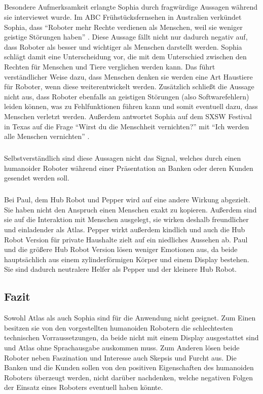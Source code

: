 \subparagraph{}
Besondere Aufmerksamkeit erlangte Sophia durch fragwürdige Aussagen während sie
interviewet wurde. Im ABC Frühstücksfernsehen in Australien verkündet Sophia,
dass "`Roboter mehr Rechte verdienen als Menschen, weil sie weniger geistige
Störungen haben"' \cite{Harald2017}. Diese Aussage fällt nicht nur dadurch
negativ auf, dass Roboter als besser und wichtiger als Menschen darstellt
werden. Sophia schlägt damit eine Unterscheidung vor, die mit dem Unterschied
zwischen den Rechten für Menschen und Tiere verglichen werden kann. Das führt
verständlicher Weise dazu, dass Menschen denken sie werden eine Art Haustiere
für Roboter, wenn diese weiterentwickelt werden. Zusätzlich schließt die
Aussage nicht aus, dass Roboter ebenfalls an geistigen Störungen (also
Softwarefehlern) leiden können, was zu Fehlfunktionen führen kann und somit
eventuell dazu, dass Menschen verletzt werden. Außerdem antwortet Sophia auf dem
SXSW Festival in Texas auf die Frage "`Wirst du die Menschheit vernichten?"' mit
"`Ich werden alle Menschen vernichten"' \cite{Harald2017}.

\subparagraph{}
Selbstverständlich sind diese Aussagen nicht das Signal, welches durch einen
humanoider Roboter während einer Präsentation an Banken oder deren Kunden
gesendet werden soll.

\subparagraph{}
Bei Paul, dem Hub Robot und Pepper wird auf eine andere Wirkung abgezielt. Sie
haben nicht den Anspruch einen Menschen exakt zu kopieren. Außerdem sind sie auf
die Interaktion mit Menschen ausgelegt, sie wirken deshalb freundlicher und
einladender als Atlas. Pepper wirkt außerdem kindlich und auch die Hub Robot
Version für private Haushalte zielt auf ein niedliches Aussehen ab. Paul und die
größere Hub Robot Version lösen weniger Emotionen aus, da beide hauptsächlich
aus einem zylinderförmigen Körper und einem Display bestehen. Sie sind dadurch
neutralere Helfer als Pepper und der kleinere Hub Robot.

\subsection{Fazit}
Sowohl Atlas als auch Sophia sind für die Anwendung nicht geeignet. Zum Einen
besitzen sie von den vorgestellten humanoiden Robotern die schlechtesten
technischen Vorraussetzungen, da beide nicht mit einem Display ausgestattet sind
und Atlas ohne Sprachausgabe auskommen muss. Zum Anderen lösen beide Roboter
neben Faszination und Interesse auch Skepsis und Furcht aus. Die Banken und die
Kunden sollen von den positiven Eigenschaften des humanoiden Roboters überzeugt
werden, nicht darüber nachdenken, welche negativen Folgen der Einsatz
eines Roboters eventuell haben könnte.

